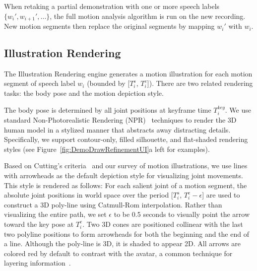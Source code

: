 When retaking a partial demonstration with one or more speech labels $\{w_i', w_{i+1}', ...\}$, the full motion analysis algorithm is run on the new recording. New motion segments then replace the original segments by mapping $w_i'$ with $w_i$.


\subsection{Illustration Rendering}

The Illustration Rendering engine generates a motion illustration for each motion segment of speech label $w_i$ (bounded by [$T_i^s$, $T_i^e$]). There are two related rendering tasks: the body pose and the motion depiction style.

The body pose is determined by all joint positions at keyframe time $T_i^{key}$.
We use standard Non-Photorealistic Rendering (NPR)~\cite{gooch1998non} techniques to render the 3D human model in a stylized manner that abstracts away distracting details. Specifically, we support contour-only, filled silhouette, and flat-shaded rendering styles
(see Figure~\ref{fig:DemoDrawRefinementUI}a left for examples).

Based on Cutting's criteria~\cite{cutting_representing_2002} and our survey of motion illustrations, we use lines with arrowheads as the default depiction style for visualizing joint movements.
This style is rendered as follows:
%
For each salient joint of a motion segment, the absolute joint positions in world space over the period [$T_i^s$, $T_i^e - \epsilon$] are used to construct a 3D poly-line using Catmull-Rom interpolation. Rather than visualizing the entire path, we set $\epsilon$ to be 0.5 seconds to visually point the arrow toward the key pose at $T_i^e$.
Two 3D cones are positioned collinear with the last two polyline positions to form arrowheads for both the beginning and the end of a line.
%
Although the poly-line is 3D, it is shaded to appear 2D.
%
All arrows are colored red by default to contrast with the avatar, a common technique for layering information~\cite{tufte1990envisioning}.

